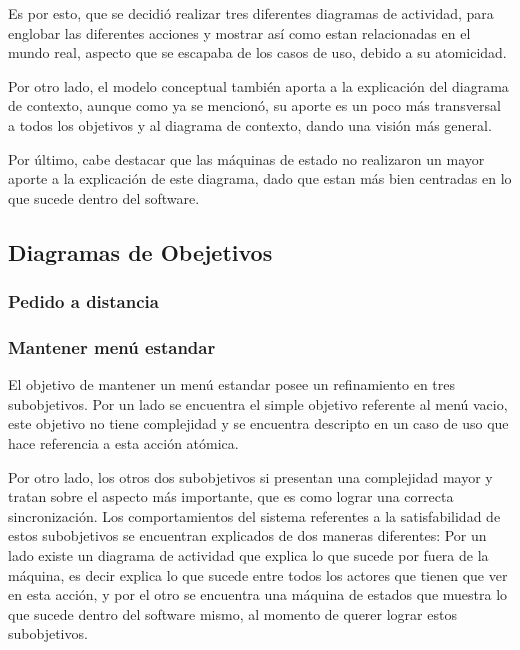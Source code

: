 \documentclass[a4paper,10pt]{article}
\begin{document}
Es por esto, que se decidi\'o realizar tres diferentes diagramas de actividad, para englobar las diferentes acciones y mostrar as\'i como 
estan relacionadas en el mundo real, aspecto que se escapaba de los casos de uso, debido a su atomicidad.



Por otro lado, el modelo conceptual tambi\'en aporta a la explicaci\'on del diagrama de contexto, aunque como ya se mencion\'o, su aporte
es un poco m\'as transversal a todos los objetivos y al diagrama de contexto, dando una visi\'on m\'as general.


Por \'ultimo, cabe destacar que las m\'aquinas de estado no realizaron un mayor aporte a la explicaci\'on de este diagrama, dado que estan m\'as bien
centradas en lo que sucede dentro del software.

\subsection*{Diagramas de Obejetivos}

\subsubsection*{Pedido a distancia}



 
\subsubsection*{Mantener men\'u estandar}

El objetivo de mantener un men\'u estandar posee un refinamiento en tres subobjetivos. Por un lado se encuentra el simple objetivo referente
al men\'u vacio, este objetivo no tiene complejidad y se encuentra descripto en un caso de uso que hace referencia a esta acci\'on at\'omica.

Por otro lado, los otros dos subobjetivos si presentan una complejidad mayor y tratan sobre el aspecto m\'as importante, que es como lograr una 
correcta sincronizaci\'on. Los comportamientos del sistema referentes a la satisfabilidad de estos subobjetivos se encuentran explicados de dos maneras
diferentes: Por un lado existe un diagrama de actividad que explica lo que sucede por fuera de la m\'aquina, es decir explica lo que sucede entre todos
los actores que tienen que ver en esta acci\'on, y por el otro se encuentra una m\'aquina de estados que muestra lo que sucede dentro del software
mismo, al momento de querer lograr estos subobjetivos.
\end{document}
